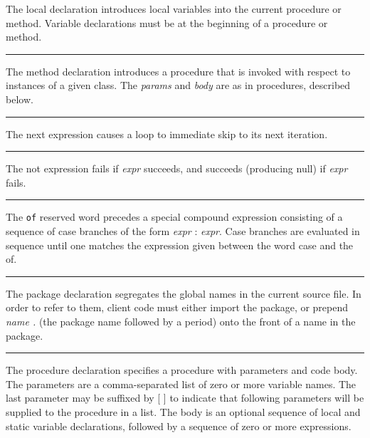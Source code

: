 \noindent
{}The \textsf{local} declaration introduces local
variables into the current procedure or method.
Variable declarations must be at the beginning of a
procedure or method.

\bigskip\hrule\vspace{0.1cm}

\noindent
{}The \textsf{method} declaration introduces a procedure
that is invoked with respect to instances of
a given class. The \textit{params} and \textit{body}
are as in procedures, described below.

\bigskip\hrule\vspace{0.1cm}

\noindent
{}The \textsf{next} expression causes a loop to
immediate skip to its next iteration.

\bigskip\hrule\vspace{0.1cm}

\noindent
{}The \textsf{not} expression fails if \textit{expr} succeeds,
and succeeds (producing null) if \textit{expr} fails.

\bigskip\hrule\vspace{0.1cm}

\noindent
{}The \texttt{of} reserved word precedes a special compound
expression consisting of a sequence of case branches of the form
\textit{expr} : \textit{expr}. Case branches are evaluated in sequence
until one matches the expression given between the word
\textsf{case} and the \textsf{of}.

\bigskip\hrule\vspace{0.1cm}

\noindent
{}The \textsf{package} declaration segregates the global
names in the current source file. In order to refer to them, client
code must either import the package, or prepend \textsf{\textit{name
.}} (the package name followed by a period) onto the front of a name in
the package.

\bigskip\hrule\vspace{0.1cm}

\noindent
{}The \textsf{procedure} declaration specifies a
procedure with parameters and code body. The parameters
are a comma-separated list of zero or more variable names. The last
parameter may be suffixed by [ ] to indicate that
following parameters will be supplied to the procedure in a list. The
body is an optional sequence of local and static variable declarations,
followed by a sequence of zero or more expressions.

